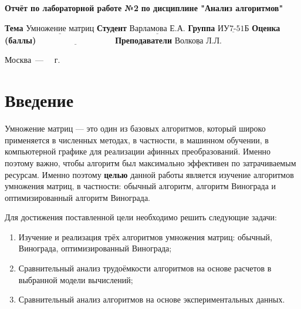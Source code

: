 \documentclass[12pt]{report}
\begin{document}
\begin{titlepage}
	
	\begin{center}
		\noindent\begin{minipage}{1.3\textwidth}\centering
			\Large\textbf{  Отчёт по лабораторной работе №2}\newline
			\textbf{по дисциплине "Анализ алгоритмов"}\newline\newline
		\end{minipage}
	\end{center}
	
	\noindent\textbf{Тема} $\underline{\text{Умножение матриц}}$\newline\newline
	\noindent\textbf{Студент} $\underline{\text{Варламова Е.А.}}$\newline\newline
	\noindent\textbf{Группа} $\underline{\text{ИУ7-51Б}}$\newline\newline
	\noindent\textbf{Оценка (баллы)} $\underline{\text{~~~~~~~~~~~~~~~~~~~~~~~~~~~}}$\newline\newline
	\noindent\textbf{Преподаватели} $\underline{\text{Волкова Л.Л.}}$\newline\newline\newline
	
	\begin{center}
		\vfill
		Москва~---~\the\year
		~г.
	\end{center}
\end{titlepage}


\tableofcontents

\newpage
\chapter*{Введение}
Умножение матриц — это один из базовых алгоритмов, который широко применяется в численных методах, в частности, в машинном обучении, в компьютерной графике для реализации афинных преобразований. Именно поэтому важно, чтобы алгоритм был максимально эффективен по затрачиваемым ресурсам. Именно поэтому \textbf{целью} данной работы является изучение алгоритмов умножения матриц, в частности: обычный алгоритм, алгоритм Винограда и оптимизированный алгоритм Винограда. 

Для достижения поставленной цели необходимо решить следующие задачи:
\begin{enumerate}
	\item Изучение и реализация трёх алгоритмов умножения матриц: обычный, Винограда, оптимизированный Винограда;
	\item Сравнительный анализ трудоёмкости алгоритмов на основе расчетов в выбранной модели вычислений;
	\item Сравнительный анализ алгоритмов на основе экспериментальных данных.
\end{enumerate}
\end{document}
